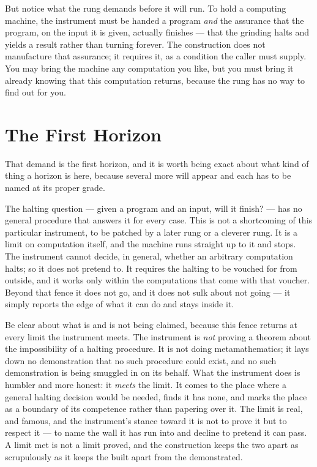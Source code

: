 But notice what the rung demands before it will run. To hold a computing machine, the instrument must be handed a
program \emph{and} the assurance that the program, on the input it is given, actually finishes --- that the
grinding halts and yields a result rather than turning forever. The construction does not manufacture that
assurance; it requires it, as a condition the caller must supply. You may bring the machine any computation you
like, but you must bring it already knowing that this computation returns, because the rung has no way to find
out for you.

\section{The First Horizon}

That demand is the first horizon, and it is worth being exact about what kind of thing a horizon is here, because
several more will appear and each has to be named at its proper grade.

The halting question --- given a program and an input, will it finish? --- has no general procedure that answers
it for every case. This is not a shortcoming of this particular instrument, to be patched by a later rung or a
cleverer rung. It is a limit on computation itself, and the machine runs straight up to it and stops. The
instrument cannot decide, in general, whether an arbitrary computation halts; so it does not pretend to. It
requires the halting to be vouched for from outside, and it works only within the computations that come with
that voucher. Beyond that fence it does not go, and it does not sulk about not going --- it simply reports the
edge of what it can do and stays inside it.

Be clear about what is and is not being claimed, because this fence returns at every limit the instrument meets.
The instrument is \emph{not} proving a theorem about the impossibility of a halting procedure. It is not doing
metamathematics; it lays down no demonstration that no such procedure could exist, and no such demonstration is
being smuggled in on its behalf. What the instrument does is humbler and more honest: it \emph{meets}
the limit. It comes to the place where a general halting decision would be needed, finds it has none, and marks
the place as a boundary of its competence rather than papering over it. The limit is real, and famous, and the
instrument's stance toward it is not to prove it but to respect it --- to name the wall it has run into and
decline to pretend it can pass. A limit met is not a limit proved, and the construction keeps the two apart as
scrupulously as it keeps the built apart from the demonstrated.

